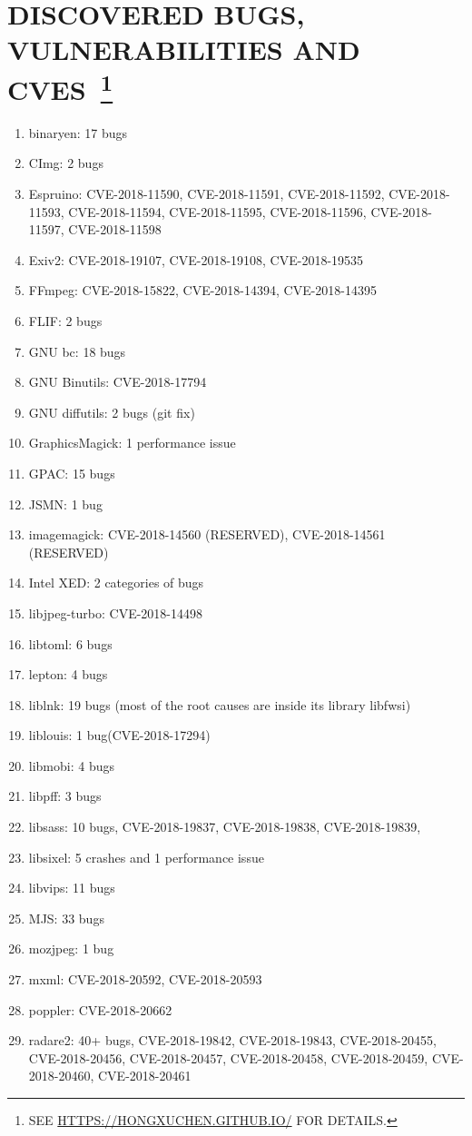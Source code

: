 \documentclass[paper=a4,fontsize=11pt]{article} %
\newcommand{\NewPart}[1]{\section*{\uppercase{#1}}}
\begin{document}
\NewPart{Discovered Bugs, Vulnerabilities and CVEs~\footnote{\lowercase{See \url{https://hongxuchen.github.io/} for details.}}}
\begin{enumerate}
    \item binaryen: 17 bugs
    \item CImg: 2 bugs
    \item Espruino: CVE-2018-11590, CVE-2018-11591, CVE-2018-11592, CVE-2018-11593, CVE-2018-11594, CVE-2018-11595, CVE-2018-11596, CVE-2018-11597, CVE-2018-11598
    \item Exiv2: CVE-2018-19107, CVE-2018-19108, CVE-2018-19535
    \item FFmpeg: CVE-2018-15822, CVE-2018-14394, CVE-2018-14395
    \item FLIF: 2 bugs
    \item GNU bc: 18 bugs
    \item GNU Binutils: CVE-2018-17794
    \item GNU diffutils: 2 bugs (git fix)
    \item GraphicsMagick: 1 performance issue
    \item GPAC: 15 bugs
    \item JSMN: 1 bug
    \item imagemagick: CVE-2018-14560 (RESERVED), CVE-2018-14561 (RESERVED)
    \item Intel XED: 2 categories of bugs
    \item libjpeg-turbo: CVE-2018-14498
    \item libtoml: 6 bugs
    \item lepton: 4 bugs
    \item liblnk: 19 bugs (most of the root causes are inside its library libfwsi)
    \item liblouis: 1 bug(CVE-2018-17294)
    \item libmobi: 4 bugs
    \item libpff: 3 bugs
    \item libsass: 10 bugs, CVE-2018-19837, CVE-2018-19838, CVE-2018-19839,
    \item libsixel: 5 crashes and 1 performance issue
    \item libvips: 11 bugs
    \item MJS: 33 bugs
    \item mozjpeg: 1 bug
    \item mxml: CVE-2018-20592, CVE-2018-20593
    \item poppler: CVE-2018-20662
    \item radare2: 40+ bugs, CVE-2018-19842, CVE-2018-19843, CVE-2018-20455, CVE-2018-20456, CVE-2018-20457, CVE-2018-20458, CVE-2018-20459, CVE-2018-20460, CVE-2018-20461

\end{enumerate}
\end{document}
